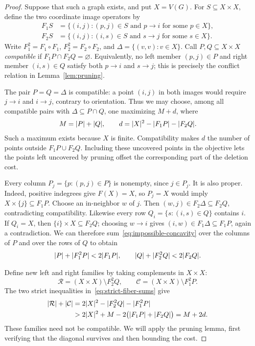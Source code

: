 \begin{proof}
Suppose that such a graph exists, and put $X=V(G)$.  For $S\subseteq X\times X$,
define the two coordinate image operators by
\[
 \begin{aligned}
 F_1S&=\{(i,j): (p,j)\in S\text{ and }p\to i
                     \text{ for some }p\in X\},\\
 F_2S&=\{(i,j): (i,s)\in S\text{ and }s\to j
                     \text{ for some }s\in X\}.
 \end{aligned}
\]
Write $F_1^2=F_1\circ F_1$, $F_2^2=F_2\circ F_2$, and
$\Delta=\{(v,v):v\in X\}$.  Call $P,Q\subseteq X\times X$ \emph{compatible}
if $F_1P\cap F_2Q=\varnothing$.  Equivalently, no left member $(p,j)\in P$
and right member $(i,s)\in Q$ satisfy both $p\to i$ and $s\to j$; this is
precisely the conflict relation in Lemma~\ref{lem:pruning}.

The pair $P=Q=\Delta$ is compatible: a point $(i,j)$ in both images would
require $j\to i$ and $i\to j$, contrary to orientation.  Thus we may choose,
among all compatible pairs with $\Delta\subseteq P\cap Q$, one maximizing
$M+d$, where
\[
 M=\lvert P\rvert+\lvert Q\rvert,\qquad
 d=\lvert X\rvert^2-\lvert F_1P\rvert-\lvert F_2Q\rvert.
\]
Such a maximum exists because $X$ is finite.  Compatibility makes $d$ the
number of points outside $F_1P\cup F_2Q$.  Including these uncovered points
in the objective lets the points left uncovered by pruning offset the
corresponding part of the deletion cost.

Every column $P_j=\{p:(p,j)\in P\}$ is nonempty, since $j\in P_j$.
It is also proper.  Indeed, positive indegrees give $F(X)=X$, so $P_j=X$
would imply $X\times\{j\}\subseteq F_1P$.  Choose an in-neighbor $w$ of
$j$.  Then $(w,j)\in F_2\Delta\subseteq F_2Q$, contradicting compatibility.
Likewise every row $Q_i=\{s:(i,s)\in Q\}$ contains $i$.  If $Q_i=X$,
then $\{i\}\times X\subseteq F_2Q$; choosing $w\to i$ gives
$(i,w)\in F_1\Delta\subseteq F_1P$, again a contradiction.
We can therefore sum~\eqref{eq:impossible-concavity} over the columns of $P$
and over the rows of $Q$ to obtain
\begin{equation}\label{eq:strict-fiber-sums}
 \lvert P\rvert+\lvert F_1^2P\rvert<2\lvert F_1P\rvert,\qquad
 \lvert Q\rvert+\lvert F_2^2Q\rvert<2\lvert F_2Q\rvert.
\end{equation}

Define new left and right families by taking complements in $X\times X$:
\[
 \mathcal R=(X\times X)\setminus F_2^2Q,
 \qquad
 \mathcal C=(X\times X)\setminus F_1^2P.
\]
The two strict inequalities in~\eqref{eq:strict-fiber-sums} give
\begin{equation}\label{eq:complement-gain}
 \begin{aligned}
 \lvert \mathcal R\rvert+\lvert \mathcal C\rvert
 &=2\lvert X\rvert^2-\lvert F_2^2Q\rvert-\lvert F_1^2P\rvert\\
 &>2\lvert X\rvert^2+M-2\bigl(\lvert F_1P\rvert+\lvert F_2Q\rvert\bigr)
 =M+2d.
 \end{aligned}
\end{equation}
These families need not be compatible.  We will apply the pruning lemma,
first verifying that the diagonal survives and then bounding the cost.


\end{proof}
